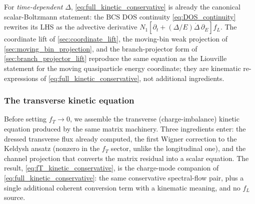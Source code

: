 \documentclass[
  aps,
  prb,
  preprint,
  superscriptaddress,
  longbibliography,
  nofootinbib
]{revtex4-2}
\newcommand{\DOS}{N_1}
\newcommand{\fL}{f_L}
\newcommand{\fT}{f_T}
\begin{document}
For \emph{time-dependent} \(\Delta\),
\cref{eq:full_kinetic_conservative} is already the canonical
scalar-Boltzmann statement: the BCS DOS continuity
\cref{eq:DOS_continuity} rewrites its LHS as the advective derivative
\(\DOS[\partial_t+(\Delta/E)\dot\Delta\,\partial_E]\fL\). The coordinate
lift of \cref{sec:coordinate_lift}, the moving-bin weak projection of
\cref{sec:moving_bin_projection}, and the branch-projector form of
\cref{sec:branch_projector_lift} reproduce the same equation as the
Liouville statement for the moving quasiparticle energy coordinate; they
are kinematic re-expressions of
\cref{eq:full_kinetic_conservative}, not additional ingredients.

\subsubsection{The transverse kinetic equation}
\label{sec:transverse_projection}

Before setting \(\fT\to0\), we assemble the transverse (charge-imbalance)
kinetic equation produced by the same matrix machinery. Three ingredients
enter: the dressed transverse flux already computed, the first Wigner
correction to the Keldysh ansatz (nonzero in the \(\fT\) sector, unlike
the longitudinal one), and the channel projection that converts the matrix
residual into a scalar equation. The result,
\cref{eq:fT_kinetic_conservative}, is the charge-mode companion of
\cref{eq:full_kinetic_conservative}: the same conservative spectral-flow
pair, plus a single additional coherent conversion term with a kinematic
meaning, and no \(\fL\) source.
\end{document}
